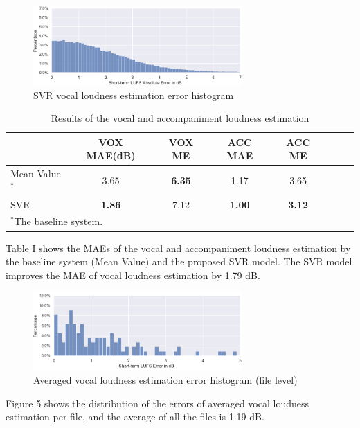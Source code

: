 \documentclass[conference]{IEEEtran}
\begin{document}
\FloatBarrier
\begin{figure}[h]
\includegraphics[width=8cm]{SVR_histogram vox.png}
\centering
\caption{SVR vocal loudness estimation error histogram}
\end{figure}
\FloatBarrier

\FloatBarrier
\bgroup
\def\arraystretch{1.3}%
\begin{table}[h]
\centering
 \caption{Results of the vocal and accompaniment loudness estimation}
 \begin{center}
\begin{tabular}{l*{6}{c}r}
\hline
\hline
              & \textbf{VOX MAE(dB)} & VOX ME & ACC MAE & ACC ME \\
\hline
Mean Value$^{\mathrm{*}}$  & 3.65 & \textbf{6.35} & 1.17 & 3.65  \\
 SVR & \textbf{1.86} & 7.12 & \textbf{1.00} & \textbf{3.12}  \\
 \hline
\multicolumn{4}{l}{$^{\mathrm{*}}$The baseline system.}
\end{tabular}
\egroup
\end{center}
\end{table}
\FloatBarrier

Table I shows the MAEs of the vocal and accompaniment loudness estimation by the baseline system (Mean Value) and the proposed SVR model. The SVR model improves the MAE of vocal loudness estimation by 1.79 dB.

\FloatBarrier
\begin{figure}[h]
\includegraphics[width=8cm]{File Level Vox.png}
\centering
\caption{Averaged vocal loudness estimation error histogram (file level)}
\end{figure}
\FloatBarrier
Figure 5 shows the distribution of the errors of averaged vocal loudness estimation per file, and the average of all the files is 1.19 dB.
\end{document}
